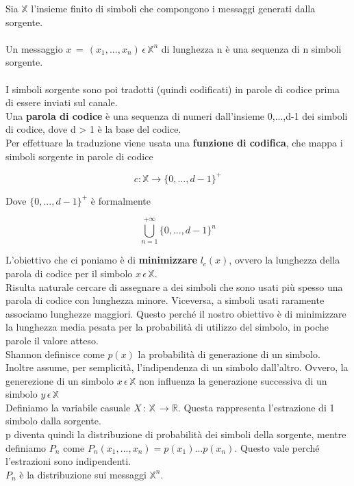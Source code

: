 \documentclass[12pt]{report}
\begin{document}
    \noindent Sia $\mathbb{X}$ l'insieme finito di simboli che compongono i messaggi generati dalla sorgente. \\ \\
    Un messaggio $x \, = \,(x_1,...,x_n)\, \epsilon \, \mathbb{X}^n$ di lunghezza n è una sequenza di n simboli sorgente.
    \\ \\
    I simboli sorgente sono poi tradotti (quindi codificati) in parole di codice prima di essere inviati sul canale. \\
    Una \textbf{parola di codice} è una sequenza di numeri dall'insieme {0,...,d-1} dei simboli di codice, dove d > 1 è la base del codice.\\
    Per effettuare la traduzione viene usata una \textbf{funzione di codifica}, che mappa i simboli sorgente in parole di codice

    $$c : \mathbb{X} \rightarrow \{0,...,d-1\}^+$$

    Dove $\{0,...,d-1\}^+$ è formalmente

    $$\bigcup_{n=1}^{+\infty}\{0,...,d-1\}^n$$

    \noindent L'obiettivo che ci poniamo è di \textbf{minimizzare} $l_c(x)$, ovvero la lunghezza della parola di codice per il simbolo $x\,\epsilon \, \mathbb{X}$. \\

    \noindent Risulta naturale cercare di assegnare a dei simboli che sono usati più spesso una parola di codice con lunghezza minore. Viceversa, a simboli usati raramente associamo lunghezze maggiori. Questo perché il nostro obiettivo è di minimizzare la lunghezza media pesata per la probabilità di utilizzo del simbolo, in poche parole il valore atteso. \\

    \noindent Shannon definisce come $p(x)$ la probabilità di generazione di un simbolo. Inoltre assume, per semplicità, l'indipendenza di un simbolo dall'altro. Ovvero, la generezione di un simbolo $x \, \epsilon \, \mathbb{X}$ non influenza la generazione successiva di un simbolo $y \, \epsilon \, \mathbb{X}$
    \\

    \noindent Definiamo la variabile casuale  $X\,:\, \mathbb{X} \, \rightarrow \mathbb{R}$. Questa rappresenta l'estrazione di 1 simbolo dalla sorgente. \\
    p diventa quindi la distribuzione di probabilità dei simboli della sorgente, mentre definiamo $P_n$ come  $P_n(x_1,...,x_n) = p(x_1)...p(x_n)$. Questo vale perché l'estrazioni sono indipendenti. \\
    $P_n$ è la distribuzione sui messaggi $\mathbb{X}^n$. \\
\end{document}
